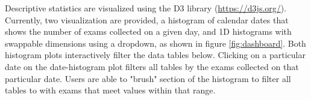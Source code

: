 Descriptive statistics are visualized using the D3 library (\href{https://d3js.org/}{https://d3js.org/}). Currently, two visualization are provided, a histogram of calendar dates that shows the number of exams collected on a given day, and 1D histograms with swappable dimensions using a dropdown, as shown in figure \ref{fig:dashboard}. Both histogram plots interactively filter the data tables below. Clicking on a particular date on the date-histogram plot filters all tables by the exams collected on that particular date. Users are able to "brush" section of the histogram to filter all tables to with exams that meet values within that range.  